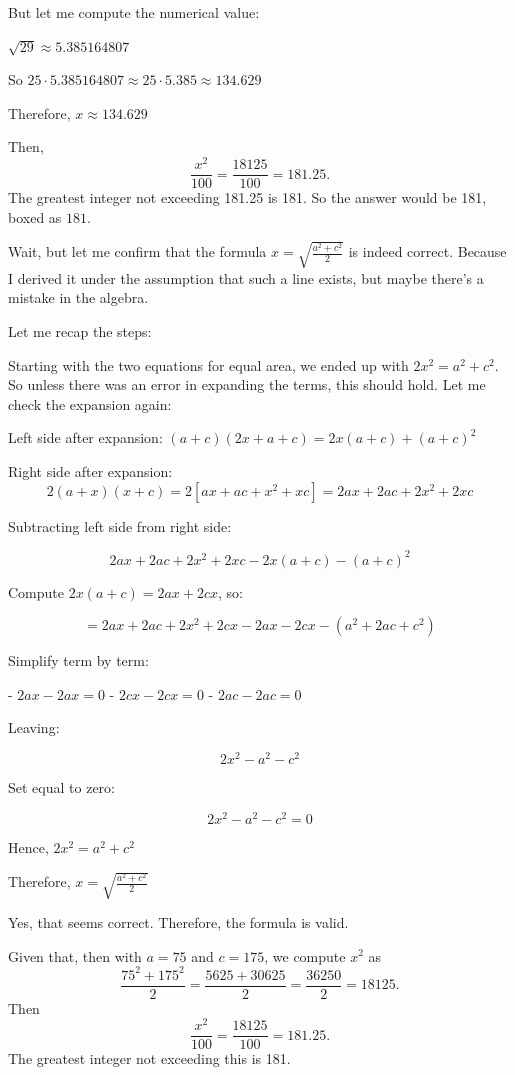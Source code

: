 \begin{tcolorbox}[
  title=Multiagent Collaborative Reasoning Trace Data Sample,
  breakable,
  colback=white,
  colframe=black
]
But let me compute the numerical value:

\( \sqrt{29} \approx 5.385164807 \)

So \( 25 \cdot 5.385164807 \approx 25 \cdot 5.385 \approx 134.629 \)

Therefore, \( x \approx 134.629 \)

Then, 
\[
\frac{x^2}{100} = \frac{18125}{100} = 181.25.
\]
The greatest integer not exceeding 181.25 is 181. So the answer would be 181, boxed as \( \boxed{181} \).

Wait, but let me confirm that the formula \( x = \sqrt{\frac{a^2 + c^2}{2}} \) is indeed correct. Because I derived it under the assumption that such a line exists, but maybe there's a mistake in the algebra.

Let me recap the steps:

Starting with the two equations for equal area, we ended up with \( 2x^2 = a^2 + c^2 \). So unless there was an error in expanding the terms, this should hold. Let me check the expansion again:

Left side after expansion: \( (a + c)(2x + a + c) = 2x(a + c) + (a + c)^2 \)

Right side after expansion: 
\[
2(a + x)(x + c) = 2[ a x + a c + x^2 + x c ] = 2a x + 2a c + 2x^2 + 2x c
\]

Subtracting left side from right side:

\[
2a x + 2a c + 2x^2 + 2x c - 2x(a + c) - (a + c)^2
\]

Compute \( 2x(a + c) = 2a x + 2c x \), so:

\[
= 2a x + 2a c + 2x^2 + 2c x - 2a x - 2c x - (a^2 + 2a c + c^2)
\]

Simplify term by term:

- \( 2a x - 2a x = 0 \)
- \( 2c x - 2c x = 0 \)
- \( 2a c - 2a c = 0 \)

Leaving:

\[
2x^2 - a^2 - c^2
\]

Set equal to zero:

\[
2x^2 - a^2 - c^2 = 0
\]

Hence, \( 2x^2 = a^2 + c^2 \)

Therefore, \( x = \sqrt{ \frac{a^2 + c^2}{2} } \)

Yes, that seems correct. Therefore, the formula is valid.

Given that, then with \( a = 75 \) and \( c = 175 \), we compute \( x^2 \) as 
\[
\frac{75^2 + 175^2}{2} = \frac{5625 + 30625}{2} = \frac{36250}{2} = 18125.
\]
Then 
\[
\frac{x^2}{100} = \frac{18125}{100} = 181.25.
\]
The greatest integer not exceeding this is 181.


\end{tcolorbox}
